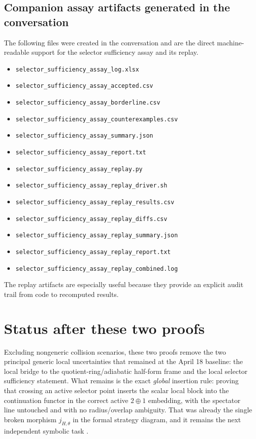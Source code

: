 \documentclass[11pt]{article}
\numberwithin{equation}{section}
\theoremstyle{definition}
\begin{document}
\subsection{Companion assay artifacts generated in the conversation}

The following files were created in the conversation and are the direct machine-readable support for the selector sufficiency assay and its replay.
\begin{itemize}
  \item \texttt{selector\_sufficiency\_assay\_log.xlsx}
  \item \texttt{selector\_sufficiency\_assay\_accepted.csv}
  \item \texttt{selector\_sufficiency\_assay\_borderline.csv}
  \item \texttt{selector\_sufficiency\_assay\_counterexamples.csv}
  \item \texttt{selector\_sufficiency\_assay\_summary.json}
  \item \texttt{selector\_sufficiency\_assay\_report.txt}
  \item \texttt{selector\_sufficiency\_assay\_replay.py}
  \item \texttt{selector\_sufficiency\_assay\_replay\_driver.sh}
  \item \texttt{selector\_sufficiency\_assay\_replay\_results.csv}
  \item \texttt{selector\_sufficiency\_assay\_replay\_diffs.csv}
  \item \texttt{selector\_sufficiency\_assay\_replay\_summary.json}
  \item \texttt{selector\_sufficiency\_assay\_replay\_report.txt}
  \item \texttt{selector\_sufficiency\_assay\_replay\_combined.log}
\end{itemize}
The replay artifacts are especially useful because they provide an explicit audit trail from code to recomputed results.

\section{Status after these two proofs}
\label{sec:status}

Excluding nongeneric collision scenarios, these two proofs remove the two principal generic local uncertainties that remained at the April 18 baseline: the local bridge to the quotient-ring/adiabatic half-form frame and the local selector sufficiency statement. What remains is the exact \emph{global} insertion rule: proving that crossing an active selector point inserts the scalar local block into the continuation functor in the correct active $2\oplus 1$ embedding, with the spectator line untouched and with no radius/overlap ambiguity. That was already the single broken morphism $j_{H,\theta}$ in the formal strategy diagram, and it remains the next independent symbolic task \cite{Strategy}.
\end{document}
